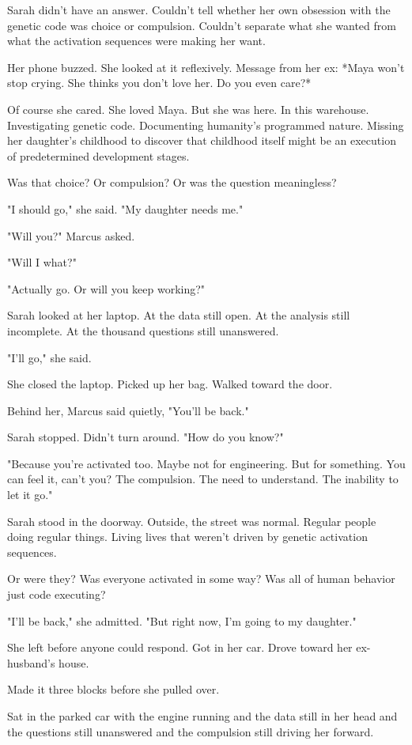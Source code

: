 Sarah didn't have an answer. Couldn't tell whether her own obsession with the genetic code was choice or compulsion. Couldn't separate what she wanted from what the activation sequences were making her want.

Her phone buzzed. She looked at it reflexively. Message from her ex: *Maya won't stop crying. She thinks you don't love her. Do you even care?*

Of course she cared. She loved Maya. But she was here. In this warehouse. Investigating genetic code. Documenting humanity's programmed nature. Missing her daughter's childhood to discover that childhood itself might be an execution of predetermined development stages.

Was that choice? Or compulsion? Or was the question meaningless?

"I should go," she said. "My daughter needs me."

"Will you?" Marcus asked.

"Will I what?"

"Actually go. Or will you keep working?"

Sarah looked at her laptop. At the data still open. At the analysis still incomplete. At the thousand questions still unanswered.

"I'll go," she said.

She closed the laptop. Picked up her bag. Walked toward the door.

Behind her, Marcus said quietly, "You'll be back."

Sarah stopped. Didn't turn around. "How do you know?"

"Because you're activated too. Maybe not for engineering. But for something. You can feel it, can't you? The compulsion. The need to understand. The inability to let it go."

Sarah stood in the doorway. Outside, the street was normal. Regular people doing regular things. Living lives that weren't driven by genetic activation sequences.

Or were they? Was everyone activated in some way? Was all of human behavior just code executing?

"I'll be back," she admitted. "But right now, I'm going to my daughter."

She left before anyone could respond. Got in her car. Drove toward her ex-husband's house.

Made it three blocks before she pulled over.

Sat in the parked car with the engine running and the data still in her head and the questions still unanswered and the compulsion still driving her forward.

